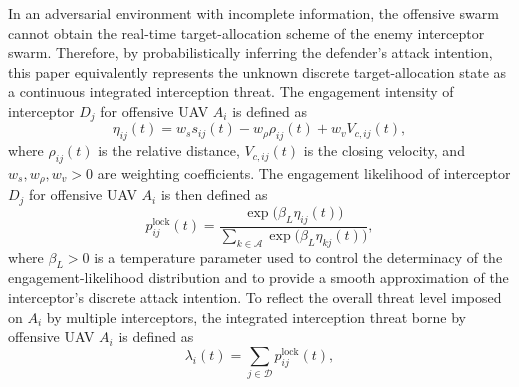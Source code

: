 \documentclass{cja}
\begin{document}
In an adversarial environment with incomplete information, the offensive swarm cannot obtain the real-time target-allocation scheme of the enemy interceptor swarm.
Therefore, by probabilistically inferring the defender's attack intention, this paper equivalently represents the unknown discrete target-allocation state as a continuous integrated interception threat.
The engagement intensity of interceptor $D_j$ for offensive UAV $A_i$ is defined as
\begin{equation}
\eta_{ij}(t)
=
w_s s_{ij}(t)
-
w_{\rho}\rho_{ij}(t)
+
w_v V_{c,ij}(t),
\end{equation}
where $\rho_{ij}(t)$ is the relative distance, $V_{c,ij}(t)$ is the closing velocity, and $w_s,w_{\rho},w_v>0$ are weighting coefficients. The engagement likelihood of interceptor $D_j$ for offensive UAV $A_i$ is then defined as
\begin{equation}
p_{ij}^{\mathrm{lock}}(t)
=
\frac{\exp\!\bigl(\beta_L \eta_{ij}(t)\bigr)}
{\sum\limits_{k\in\mathcal{A}}\exp\!\bigl(\beta_L \eta_{kj}(t)\bigr)},
\label{eq:soft-lock-prob}
\end{equation}
where $\beta_L>0$ is a temperature parameter used to control the determinacy of the engagement-likelihood distribution and to provide a smooth approximation of the interceptor's discrete attack intention.
To reflect the overall threat level imposed on $A_i$ by multiple interceptors, the integrated interception threat borne by offensive UAV $A_i$ is defined as
\begin{equation}
\lambda_i(t)
=
\sum_{j\in\mathcal D}p_{ij}^{\mathrm{lock}}(t),
\label{eq:soft-lock-pressure}
\end{equation}
\end{document}
